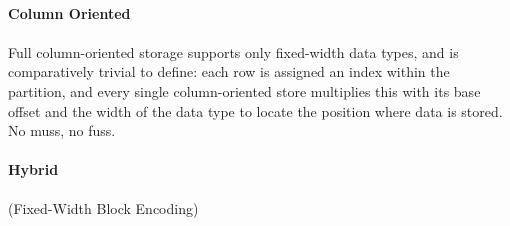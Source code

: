 \documentclass[fleqn]{article}
\begin{document}
\clearpage
\paragraph{Column Oriented}
\paragraph{}
Full column-oriented storage supports only fixed-width data types, and is comparatively trivial to define:
each row is assigned an index within the partition, and every single column-oriented store multiplies this
with its base offset and the width of the data type to locate the position where data is stored. No muss, no fuss.
\paragraph{Hybrid}\normalsize{(Fixed-Width Block Encoding)}
\end{document}
